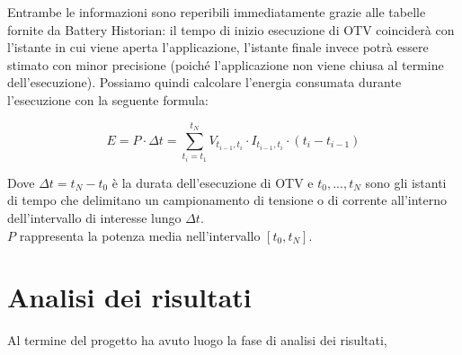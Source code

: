 Entrambe le informazioni sono reperibili immediatamente grazie alle tabelle fornite da Battery Historian: il tempo di inizio
esecuzione di OTV coinciderà con l'istante in cui viene aperta l'applicazione, l'istante finale invece potrà essere stimato
con minor precisione (poiché l'applicazione non viene chiusa al termine dell'esecuzione).
Possiamo quindi calcolare l'energia consumata durante l'esecuzione con la seguente formula:

\begin{equation*}
    E = P \cdot \Delta t = \sum_{t_i = t_1}^{t_N} V_{t_{i-1}, t_i} \cdot I_{t_{i-1}, t_i} \cdot (t_i - t_{i-1})
\end{equation*}

Dove $\Delta t = t_N - t_0$ è la durata dell'esecuzione di OTV e $t_0, ..., t_N$ sono gli istanti di tempo che delimitano
un campionamento di tensione o di corrente all'interno dell'intervallo di interesse lungo $\Delta t$.\\
$P$ rappresenta la potenza media nell'intervallo $[t_0, t_N]$.

\section{Analisi dei risultati}

Al termine del progetto ha avuto luogo la fase di analisi dei risultati,